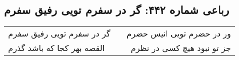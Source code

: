 \begin{center}
\section*{رباعی شماره ۴۴۲: گر در سفرم تویی رفیق سفرم}
\label{sec:sh442}
\begin{longtable}{l p{0.5cm} r}
گر در سفرم تویی رفیق سفرم
&&
ور در حضرم تویی انیس حضرم
\\
القصه بهر کجا که باشد گذرم
&&
جز تو نبود هیچ کسی در نظرم
\\
\end{longtable}
\end{center}
